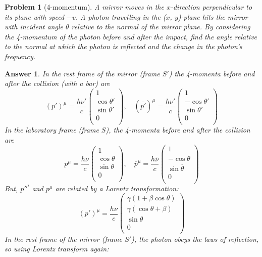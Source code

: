 \documentclass[a4paper]{article}
\theoremstyle{new2}
\newtheorem{ans}{Answer}[section]
\theoremstyle{new}
\newtheorem{qns}{Problem}[section]
\begin{document}
\begin{qns}[4-momentum]
A mirror moves in the $x$-direction perpendicular to its plane with speed $−v$. A photon travelling in the ($x$, $y$)-plane hits the mirror with incident angle $\theta$ relative to the normal of the mirror plane. By considering the 4-momentum of the photon before and after the impact, find the angle relative to the normal at which the photon is reflected and the change in the photon’s frequency.
\end{qns}
\begin{ans}
In the rest frame of the mirror (frame $S'$) the 4-momenta before and after the collision (with a bar) are
$$(p')^\mu=\frac{h\nu'}{c}\begin{pmatrix}1\\\cos\theta'\\\sin\theta'\\0\\\end{pmatrix},\quad (\overline{p'})^\mu=\frac{h\nu'}{c}\begin{pmatrix}1\\-\cos\theta'\\\sin\theta'\\0\\\end{pmatrix}$$
In the laboratory frame (frame $S$), the 4-momenta before and after the collision are
$$p^\mu=\frac{h\nu}{c}\begin{pmatrix}1\\\cos\theta\\\sin\theta\\0\\\end{pmatrix},\quad \overline{p}^\mu=\frac{h\overline{\nu}}{c}\begin{pmatrix}1\\-\cos\overline{\theta}\\\sin\overline{\theta}\\0\\\end{pmatrix}$$
But, $p'^\mu$ and $p^\mu$ are related by a Lorentz transformation:
$$(p')^\mu=\frac{h\nu}{c}\begin{pmatrix}\gamma(1+\beta\cos\theta)\\\gamma(\cos\theta+\beta)\\\sin\theta\\0\\\end{pmatrix}$$
In the rest frame of the mirror (frame $S'$), the photon obeys the laws of reflection, so using Lorentz transform again:

\end{ans}
\end{document}
